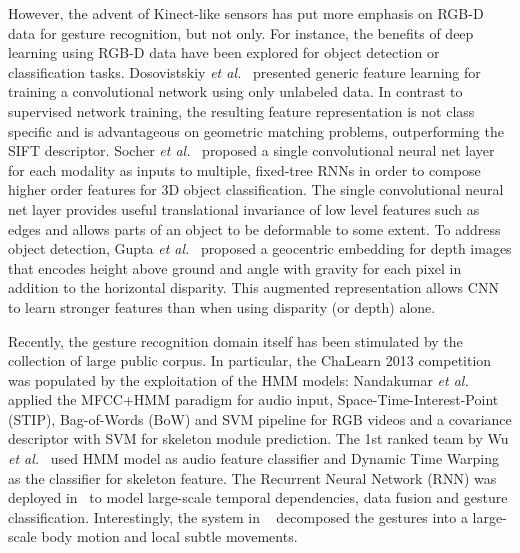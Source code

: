 However, the advent of  Kinect-like sensors has put more emphasis on RGB-D data for gesture recognition, but not only.
For instance, the benefits of deep learning using RGB-D data have been explored for object detection or classification tasks.
%
Dosovistskiy \emph{et al.}~\cite{DosovitskiySRB14} presented generic feature learning for training a convolutional network using only unlabeled data. In contrast to supervised network training, the resulting feature representation is not class specific and is advantageous on geometric matching problems, outperforming the SIFT descriptor.
Socher \emph{et al.}~\cite{socher2012convolutional} proposed a single convolutional neural net layer for each modality as inputs to multiple, fixed-tree RNNs in order to compose higher order features for 3D object classification. The single convolutional neural net layer provides useful translational invariance of low level features such as edges and allows parts of an object to be deformable to some extent.
To address object detection, Gupta \emph{et al.}~\cite{gupta2014learning} proposed a geocentric embedding for depth images that encodes height above ground and angle with gravity for each pixel in addition to the horizontal disparity.
This augmented representation allows CNN to learn stronger features than when using disparity (or depth) alone.

Recently, the gesture recognition domain itself has been stimulated by the collection of large public corpus.
In particular, the ChaLearn 2013 competition was populated by the exploitation of the HMM models:
Nandakumar \emph{et al.}~\cite{nandakumar2013multi} applied the MFCC+HMM paradigm for audio input, Space-Time-Interest-Point (STIP), Bag-of-Words (BoW) and SVM pipeline for RGB videos and a covariance descriptor with SVM for skeleton module prediction. The 1st ranked team by Wu \emph{et al.}~\cite{wu2013fusing} used HMM model as audio feature classifier and Dynamic Time Warping as the classifier for skeleton feature.  The Recurrent Neural Network (RNN) was deployed in~\cite{neverova2013multi} to model large-scale temporal dependencies, data fusion and gesture classification.  Interestingly, the system in ~\cite{neverova2013multi} decomposed the gestures into a large-scale body motion and local subtle movements.

